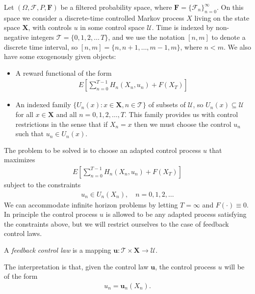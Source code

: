 \documentclass[\topdir/lecture\_notes.tex]{subfiles}
\begin{document}
Let $(\Omega, \mathcal{F}, P, \mathbf{F})$ be a filtered probability space, where $\mathbf{F}=\{\mathcal{F}_{n}\}_{n=0}^{\infty}$. On this space we consider a discrete-time controlled Markov process $X$ living on the state space $\mathbf{X}$, with controls $u$ in some control space $\mathcal{U}$. Time is indexed by non-negative integers $\mathcal{T}=\{0,1,2,\ldots\,T\}$, and we use the notation $[n, m]$ to denote a discrete time interval, so $[n, m]=\{n, n+1, \ldots, m-1, m\}$, where $n<m$. We also have some exogenously given objects:
\begin{itemize}
  \item A reward functional of the form
\begin{align*}
E\left[\sum_{n=0}^{T-1} H_{n}(X_{n}, u_{n})+F(X_{T})\right]
\end{align*}
  \item An indexed family $\{U_{n}(x): x \in \mathbf{X},n\in\mathcal{T}\}$ of subsets of $\mathcal{U}$, so $U_{n}(x) \subseteq \mathcal{U}$ for all $x \in \mathbf{X}$ and all $n=0,1,2, \ldots, T$. This family provides us with control restrictions in the sense that if $X_{n}=x$ then we must choose the control $u_{n}$ such that $u_{n} \in U_{n}(x)$.
\end{itemize}
The problem to be solved is to choose an adapted control process $u$ that maximizes
\begin{align*}
E\left[\sum_{n=0}^{T-1} H_{n}(X_{n}, u_{n})+F(X_{T})\right]
\end{align*}
subject to the constraints
\begin{align*}
u_{n} \in U_{n}(X_{n}), \quad n=0,1,2, \ldots
\end{align*}
We can accommodate infinite horizon problems by letting $T=\infty$ and $F(\cdot)\equiv0$. In principle the control process $u$ is allowed to be any adapted process satisfying the constraints above, but we will restrict ourselves to the case of feedback control laws. 
\begin{defn}
A \emph{feedback control law} is a mapping $\mathbf{u}: \mathcal{T} \times \mathbf{X} \rightarrow \mathcal{U}$.
\end{defn}
The interpretation is that, given the control law $\mathbf{u}$, the control process $u$ will be of the form
\begin{align*}
u_{n}=\mathbf{u}_{n}(X_{n}).
\end{align*}
\end{document}
